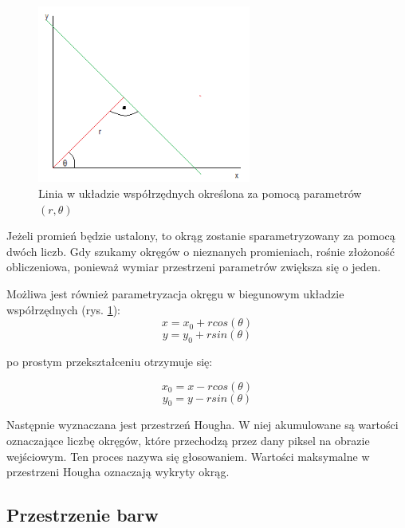 \begin{figure}[h]
\centering
\includegraphics[width=7cm]{img/hough.png}
\caption{Linia w układzie współrzędnych określona za pomocą parametrów $(r, \theta)$}
\label{fig:hough}
\end{figure}

Jeżeli promień będzie ustalony, to okrąg zostanie sparametryzowany za pomocą dwóch liczb. 
Gdy szukamy okręgów o nieznanych promieniach, rośnie złożoność obliczeniowa, ponieważ wymiar przestrzeni parametrów zwiększa się o jeden.

Możliwa jest również parametryzacja okręgu w biegunowym układzie współrzędnych (rys. \ref{fig:hough}):
\begin{equation}
x = x_0 + rcos(\theta)
\end{equation}
\begin{equation}
y = y_0 + rsin(\theta)
\end{equation}

po prostym przekształceniu otrzymuje się:

\begin{equation}
x_0 = x - rcos(\theta)
\end{equation}
\begin{equation}
y_0 = y - rsin(\theta)
\end{equation}

Następnie wyznaczana jest przestrzeń Hougha. W niej akumulowane są wartości oznaczające liczbę okręgów, które przechodzą przez dany piksel na obrazie wejściowym. Ten proces nazywa się głosowaniem. 
Wartości maksymalne w przestrzeni Hougha oznaczają wykryty okrąg.


\subsection{Przestrzenie barw}


